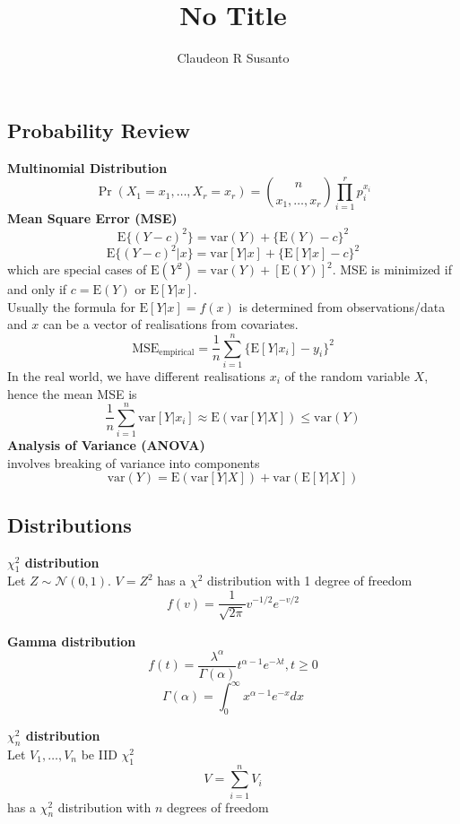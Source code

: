 \documentclass{article}
\title{No Title}
\author{Claudeon R Susanto}
\date{}
\begin{document}
{}\selectfont
\begin{multicols}{2}
\section{Probability Review}

\textbf{Multinomial Distribution}
$$\Pr(X_1=x_1, \dots, X_r = x_r) = {n \choose {x_1,\dots,x_r}} \prod_{i=1}^rp_i^{x_i}$$
\textbf{Mean Square Error (MSE)}
$$\text{E}\{(Y-c)^2\} = \text{var}(Y) + \{\text{E}(Y)-c\}^2$$
$$\text{E}\{(Y-c)^2|x\} = \text{var}[Y|x] + \{\text{E}[Y|x]-c\}^2$$
which are special cases of $\text{E}(Y^2) = \text{var}(Y) + [\text{E}(Y)]^2$. MSE is minimized if and only if $c=\text{E}(Y)$ or $\text{E}[Y|x]$.\\
Usually the formula for $\text{E}[Y|x]=f(x)$ is determined from observations/data and $x$ can be a vector of realisations from covariates.
$$\text{MSE}_{\text{empirical}} = \frac{1}{n}\sum_{i=1}^n\{\text{E}[Y|x_i]-y_i\}^2$$
In the real world, we have different realisations $x_i$ of the random variable $X$, hence the mean MSE is
$$\frac{1}{n}\sum_{i=1}^{n}\text{var}[Y|x_i] \approx \text{E}(\text{var}[Y|X]) \leq \text{var}(Y)$$
\textbf{Analysis of Variance (ANOVA)}\\
involves breaking of variance into components
$$\text{var}(Y) = \text{E}(\text{var}[Y|X]) + \text{var}(\text{E}[Y|X])$$

\subsection{Distributions}

\textbf{$\chi^2_1$ distribution}\\
Let $Z \sim \mathcal{N}(0,1)$. $V = Z^2$ has a $\chi^2$ distribution with 1 degree of freedom
$$f(v) = \frac{1}{\sqrt{2\pi}}v^{-1/2}e^{-v/2}$$

\textbf{Gamma distribution}
$$f(t) = \frac{\lambda^\alpha}{\Gamma(\alpha)}t^{\alpha-1}e^{-\lambda t}, t\geq 0$$
$$\Gamma(\alpha) = \int_{0}^{\infty}x^{\alpha-1}e^{-x}dx$$

\textbf{$\chi^2_n$ distribution}\\
Let $V_1,\dots,V_n$ be IID $\chi^2_1$
$$V = \sum_{i=1}^nV_i$$
has a $\chi^2_n$ distribution with $n$ degrees of freedom\\


\end{multicols}
\end{document}

